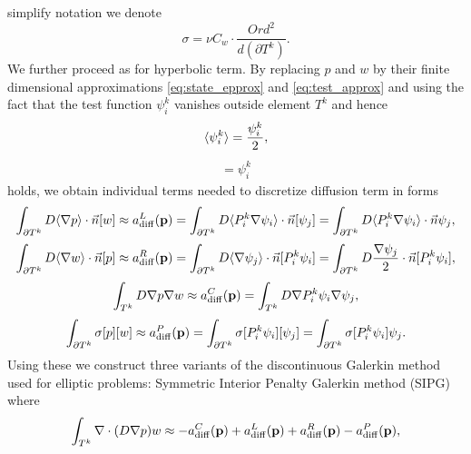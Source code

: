 simplify notation 
we denote
\begin{equation}\label{eq:diff_penalty_sigma}
\sigma = \nu C_w \cdot \frac{Ord^2}{d(\partial T^k)}.
\end{equation} 
We further proceed as for hyperbolic term. By replacing $p$ and $w$ by their 
finite dimensional approximations \eqref{eq:state_epprox} and 
\eqref{eq:test_approx} and using the fact that the test function $\psi^k_i$ 
vanishes outside element $T^k$ and hence
\begin{eqnarray}
    \langle\psi^k_i\rangle = \frac{\psi^k_i}{2},
\end{eqnarray}
\begin{eqnarray}
    [\psi^k_i] = \psi^k_i
\end{eqnarray}
holds, we obtain individual terms needed to discretize diffusion term in forms
\begin{equation}\label{eq:diff_left_approx}
    \int_{\partial T^k} D \langle\nabla p\rangle \cdot \vec{n} [w] 
    \approx
    a^L_\mathrm{diff}(\mathbf{p}) = 
        \int_{\partial T^k} D \langle P^k_i\nabla\psi_i\rangle \cdot \vec{n}[\psi_j] =
        \int_{\partial T^k} D \langle P^k_i\nabla\psi_i\rangle \cdot \vec{n}\psi_j,
\end{equation}
\begin{equation}\label{eq:diff_right_approx}
        \int_{\partial T^k} D \langle\nabla w \rangle\cdot \vec{n} [p] 
        \approx
        a^R_\mathrm{diff}(\mathbf{p}) =
            \int_{\partial T^k} D \langle\nabla \psi_j \rangle\cdot \vec{n} [P^k_i\psi_i] =
            \int_{\partial T^k} D \frac{\nabla \psi_j}{2}\cdot \vec{n} 
            [P^k_i\psi_i],
\end{equation}
\begin{equation}\label{eq:diff_laplace_approx}
    \int_{T^k} D\nabla p \nabla w 
    \approx
    a^C_\mathrm{diff}(\mathbf{p})=
        \int_{T^k} D\nabla P^k_i\psi_i \nabla \psi_j,
\end{equation}
\begin{equation}\label{eq:diff_penalty_approx}
        \int_{\partial T^k} \sigma [p][w] 
        \approx
        a^P_\mathrm{diff}(\mathbf{p})=
         \int_{\partial T^k} \sigma [P^k_i\psi_i][\psi_j] 
         = \int_{\partial T^k} \sigma [P^k_i\psi_i]\psi_j.
\end{equation}
Using these we construct three variants of the discontinuous Galerkin method used for 
elliptic problems: Symmetric Interior Penalty Galerkin method (SIPG) where
\begin{equation}\label{eq:sipg}
\int_{T^k}\nabla\cdot(D\nabla p) w \approx - a^C_\mathrm{diff}(\mathbf{p}) 
    + a^L_\mathrm{diff}(\mathbf{p}) + a^R_\mathrm{diff}(\mathbf{p}) 
    - a^P_\mathrm{diff}(\mathbf{p}),
\end{equation}
